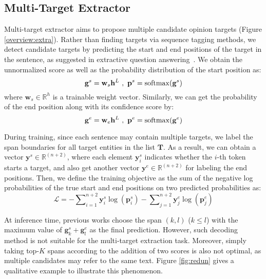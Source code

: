 \documentclass[11pt,a4paper]{article}
\begin{document}
\subsection{Multi-Target Extractor		\label{sec:extrac}}
Multi-target extractor aims to propose multiple candidate opinion targets (Figure \ref{overview:extra}).
Rather than finding targets via sequence tagging methods, we detect candidate targets by predicting the start and end positions of the target in the sentence, as suggested in extractive question answering~\cite{wang2016machine,seo2016bidirectional,hu2017reinforced}.
We obtain the unnormalized score as well as the probability distribution of the start position as:
\begin{equation}
\mathbf{g}^s = \mathbf{w}_s \mathbf{h}^L \ , \  \mathbf{p}^s = \mathrm{softmax}(\mathbf{g}^s)	\nonumber \\
\end{equation}
where $\mathbf{w}_s \in\mathbb{R}^{h}$ is a trainable weight vector. Similarly, we can get the probability of the end position along with its confidence score by:
\begin{equation}
\mathbf{g}^e = \mathbf{w}_e \mathbf{h}^L \ , \  \mathbf{p}^e = \mathrm{softmax}(\mathbf{g}^e)	\nonumber \\
\end{equation}

During training, since each sentence may contain multiple targets, we label the span boundaries for all target entities in the list $\mathbf{T}$.
As a result, we can obtain a vector $\mathbf{y}^s \in\mathbb{R}^{(n+2)}$, where each element $\mathbf{y}^s_i$ indicates whether the $i$-th token starts a target, and also get another vector $\mathbf{y}^e \in\mathbb{R}^{(n+2)}$ for labeling the end positions.
Then, we define the training objective as the sum of the negative log probabilities of the true start and end positions on two predicted probabilities as:
\begin{equation} 
	\mathcal{L} = - \sum\nolimits_{i=1}^{n+2} \mathbf{y}^s_i \log (\mathbf{p}^s_i) - \sum\nolimits_{j=1}^{n+2} \mathbf{y}^e_j \log (\mathbf{p}^e_j)	\nonumber
\end{equation}

At inference time, previous works choose the span $(k, l)$ ($k \le l$) with the maximum value of $\mathbf{g}^s_k + \mathbf{g}^e_l$ as the final prediction.
However, such decoding method is not suitable for the multi-target extraction task.
Moreover, simply taking top-$K$ spans according to the addition of two scores is also not optimal, as multiple candidates may refer to the same text. 
Figure \ref{fig:redun} gives a qualitative example to illustrate this phenomenon. 
\end{document}
